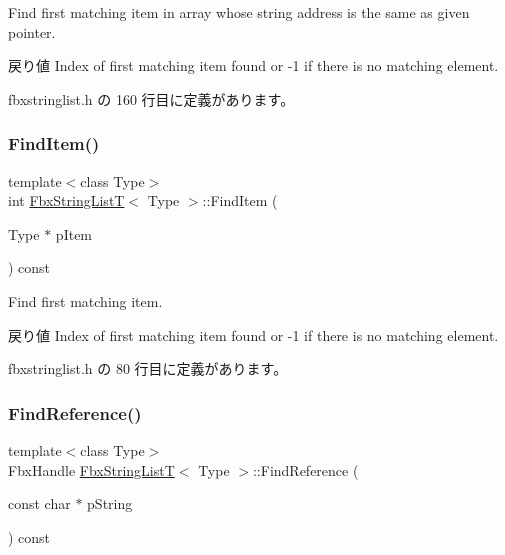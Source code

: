 Find first matching item in array whose string address is the same as given pointer. \begin{DoxyReturn}{戻り値}
Index of first matching item found or -\/1 if there is no matching element. 
\end{DoxyReturn}


 fbxstringlist.\+h の 160 行目に定義があります。

\mbox{\label{class_fbx_string_list_t_a9d903a2352e10982c18d3e37fcc58ef6}} 
\subsubsection{\texorpdfstring{Find\+Item()}{FindItem()}}
{\footnotesize\ttfamily template$<$class Type$>$ \\
int \hyperlink{class_fbx_string_list_t}{Fbx\+String\+ListT}$<$ Type $>$\+::Find\+Item (\begin{DoxyParamCaption}\item[{Type $\ast$}]{p\+Item }\end{DoxyParamCaption}) const\hspace{0.3cm}{\ttfamily [inline]}}

Find first matching item. \begin{DoxyReturn}{戻り値}
Index of first matching item found or -\/1 if there is no matching element. 
\end{DoxyReturn}


 fbxstringlist.\+h の 80 行目に定義があります。

\mbox{\label{class_fbx_string_list_t_acb79b34d154663f6f7478bfa823641b4}} 
\subsubsection{\texorpdfstring{Find\+Reference()}{FindReference()}}
{\footnotesize\ttfamily template$<$class Type$>$ \\
Fbx\+Handle \hyperlink{class_fbx_string_list_t}{Fbx\+String\+ListT}$<$ Type $>$\+::Find\+Reference (\begin{DoxyParamCaption}\item[{const char $\ast$}]{p\+String }\end{DoxyParamCaption}) const\hspace{0.3cm}{\ttfamily [inline]}}

